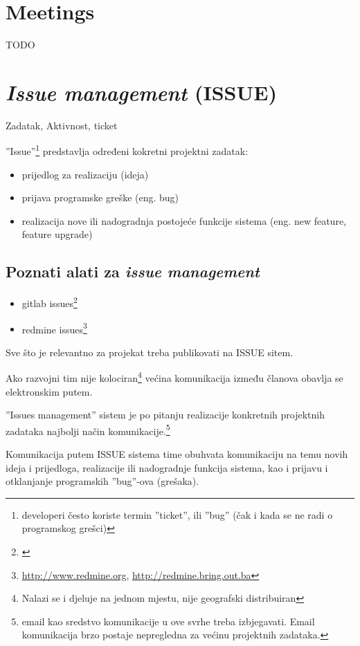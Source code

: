 \documentclass[lmodern, utf8, zavrsni]{fit}
\begin{document}
\section{Meetings}


TODO

\section{\emph{Issue management} (ISSUE)}

Zadatak, Aktivnost, ticket

''Issue''\footnote{developeri često koriste termin ''ticket'', ili ''bug'' (čak i kada se ne radi o programskog grešci)} predstavlja određeni kokretni projektni zadatak:
\begin{itemize}
  \item prijedlog za realizaciju (ideja)
  \item prijava programske greške (eng. bug)
  \item realizacija nove ili nadogradnja postojeće funkcije sistema (eng. new feature, feature upgrade)
\end{itemize}

\subsection{Poznati alati za \emph{issue management}}

\begin{itemize}
  \item gitlab issues\footnote{\citep{agilegit}}
  \item redmine issues\footnote{\url{http://www.redmine.org}, \url{http://redmine.bring.out.ba}}
\end{itemize}

Sve što je relevantno za projekat treba publikovati na ISSUE sitem.

Ako razvojni tim nije kolociran\footnote{Nalazi se i djeluje na jednom mjestu, nije geografski distribuiran} većina komunikacija između članova obavlja se elektronskim putem.

''Issues management'' sistem je po pitanju realizacije konkretnih projektnih zadataka najbolji način komunikacije.\footnote{email kao sredstvo komunikacije u ove svrhe treba izbjegavati. Email komunikacija brzo postaje nepregledna za većinu projektnih zadataka.}

Komunikacija putem ISSUE sistema time obuhvata komunikaciju na temu novih ideja i prijedloga, realizacije ili nadogradnje funkcija sistema, kao i prijavu i otklanjanje programskih ''bug''-ova (grešaka).
\end{document}

